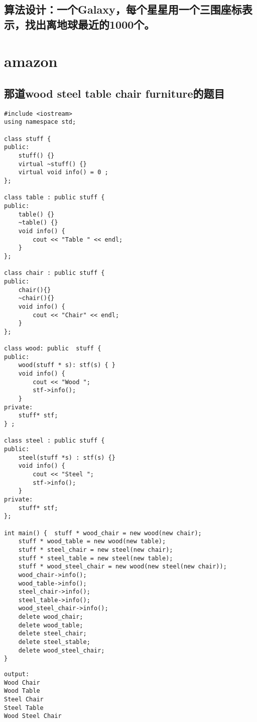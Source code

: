 \documentclass[12pt]{book}
\begin{document}
\section{算法设计：一个Galaxy，每个星星用一个三围座标表示，找出离地球最近的1000个。}
\label{sec-25-14}

\chapter{amazon}
\label{sec-26}
\section{那道wood steel table chair furniture的题目}
\label{sec-26-1}
\lstset{language=java,label= ,caption= ,numbers=none}
\begin{lstlisting}
#include <iostream>
using namespace std;

class stuff {
public:
    stuff() {}
    virtual ~stuff() {}
    virtual void info() = 0 ;
};

class table : public stuff {
public:
    table() {}
    ~table() {}
    void info() {
        cout << "Table " << endl;
    }
};

class chair : public stuff {
public:
    chair(){}
    ~chair(){}
    void info() {
        cout << "Chair" << endl;
    }
};

class wood: public  stuff {
public:
    wood(stuff * s): stf(s) { }
    void info() {
        cout << "Wood ";
        stf->info();
    }
private:
    stuff* stf;
} ;

class steel : public stuff {
public:
    steel(stuff *s) : stf(s) {}
    void info() {
        cout << "Steel ";
        stf->info();
    }
private:
    stuff* stf;
};

int main() {  stuff * wood_chair = new wood(new chair); 
    stuff * wood_table = new wood(new table); 
    stuff * steel_chair = new steel(new chair); 
    stuff * steel_table = new steel(new table); 
    stuff * wood_steel_chair = new wood(new steel(new chair)); 
    wood_chair->info(); 
    wood_table->info(); 
    steel_chair->info(); 
    steel_table->info(); 
    wood_steel_chair->info(); 
    delete wood_chair; 
    delete wood_table; 
    delete steel_chair; 
    delete steel_stable; 
    delete wood_steel_chair; 
}
\end{lstlisting}

\lstset{language=java,label= ,caption= ,numbers=none}
\begin{lstlisting}
output:
Wood Chair
Wood Table 
Steel Chair
Steel Table 
Wood Steel Chair
\end{lstlisting}
\end{document}
